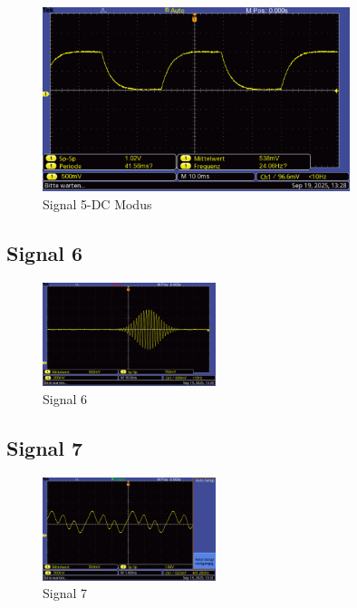 \begin{figure} [h!]
    \centering
        \includegraphics[width=0.8\textwidth]{img/25/Signale2/Signal5-DC.pdf}
    \caption{Signal 5-DC Modus}
    \label{fig:sig5-dc}
\end{figure}
\twocolumn

\newpage
\onecolumn
\twocolumn

\subsection*{Signal 6}
\begin{figure} [h!]
    \centering
        \includegraphics[width=0.45\textwidth]{img/25/Signale2/Signal6.pdf}
    \caption{Signal 6}
\end{figure}

\subsection*{Signal 7}
\begin{figure} [h!]
    \centering
        \includegraphics[width=0.45\textwidth]{img/25/Signale2/Signal7.pdf}
    \caption{Signal 7}
\end{figure}


